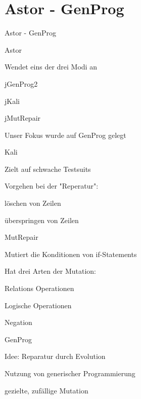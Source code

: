 \section{Astor \-- GenProg}
%
\begin{frame}{}
	\begin{center}
		\huge{Astor \-- GenProg}
	\end{center}
\end{frame}
%
\begin{frame}{Astor}
	\begin{itemizes}{1em}
		\item Wendet eins der drei Modi an
		\begin{itemizes}{0.2em}
			\item jGenProg2
			\item jKali
			\item jMutRepair
		\end{itemizes}
		\item Unser Fokus wurde auf GenProg gelegt
	\end{itemizes}
\end{frame}
%
\begin{frame}{Kali}
	\begin{itemizes}{1em}
		\item Zielt auf schwache Testsuits
		\item Vorgehen bei der "Reperatur":
		\begin{itemizes}{0.2em}
			\item löschen von Zeilen
			\item überspringen von Zeilen
		\end{itemizes}
	\end{itemizes}
\end{frame}
%
\begin{frame}{MutRepair}
	\begin{itemizes}{1em}
		\item Mutiert die Konditionen von if-Statements
		\item Hat drei Arten der Mutation:
		\begin{itemizes}{0.2em}
			\item Relations Operationen
			\item Logische Operationen
			\item Negation
		\end{itemizes}
	\end{itemizes}
\end{frame}
%
\begin{frame}{GenProg}
	\begin{itemizes}{1em}
		\item Idee: Reparatur durch Evolution
		\begin{itemizes}{1em}
			\item Nutzung von generischer Programmierung
			\item gezielte, zufällige Mutation
		\end{itemizes}
	\end{itemizes}
\end{frame}

